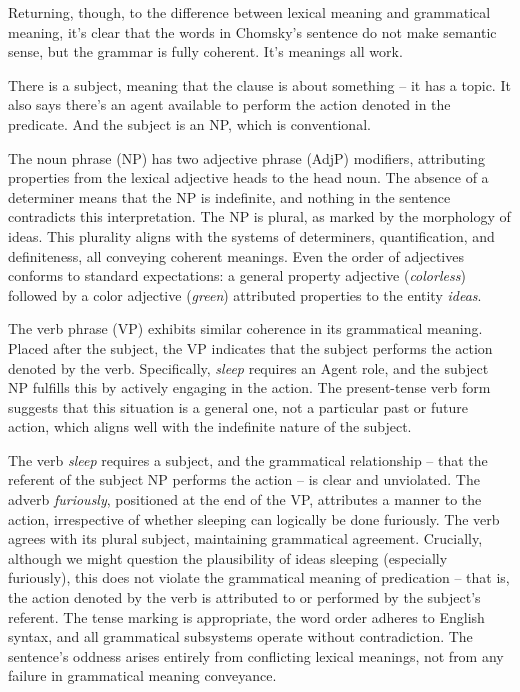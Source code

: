 Returning, though, to the difference between lexical meaning and grammatical meaning, it's clear that the words in Chomsky's sentence do not make semantic sense, but the grammar is fully coherent. It's meanings all work.

There is a subject, meaning that the clause is about something -- it has a topic. It also says there's an agent available to perform the action denoted in the predicate. And the subject is an NP, which is conventional.

The noun phrase (NP) has two adjective phrase (AdjP) modifiers, attributing properties from the lexical adjective heads to the head noun. The absence of a determiner means that the NP is indefinite, and nothing in the sentence contradicts this interpretation. The NP is plural, as marked by the morphology of ideas. This plurality aligns with the systems of determiners, quantification, and definiteness, all conveying coherent meanings. Even the order of adjectives conforms to standard expectations: a general property adjective (\textit{colorless}) followed by a color adjective (\textit{green}) attributed properties to the entity \textit{ideas}.

The verb phrase (VP) exhibits similar coherence in its grammatical meaning. Placed after the subject, the VP indicates that the subject performs the action denoted by the verb. Specifically, \textit{sleep} requires an Agent role, and the subject NP fulfills this by actively engaging in the action. The present-tense verb form suggests that this situation is a general one, not a particular past or future action, which aligns well with the indefinite nature of the subject.

The verb \textit{sleep} requires a subject, and the grammatical relationship -- that the referent of the subject NP performs the action -- is clear and unviolated. The adverb \textit{furiously}, positioned at the end of the VP, attributes a manner to the action, irrespective of whether sleeping can logically be done furiously. The verb agrees with its plural subject, maintaining grammatical agreement. Crucially, although we might question the plausibility of ideas sleeping (especially furiously), this does not violate the grammatical meaning of predication -- that is, the action denoted by the verb is attributed to or performed by the subject's referent. The tense marking is appropriate, the word order adheres to English syntax, and all grammatical subsystems operate without contradiction. The sentence's oddness arises entirely from conflicting lexical meanings, not from any failure in grammatical meaning conveyance.

